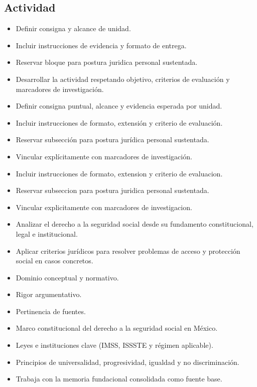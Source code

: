 \documentclass[12pt]{article}
\begin{document}
\subsection*{Actividad}
\begin{itemize}[leftmargin=*]
  \item Definir consigna y alcance de unidad.
  \item Incluir instrucciones de evidencia y formato de entrega.
  \item Reservar bloque para postura juridica personal sustentada.
  \item Desarrollar la actividad respetando objetivo, criterios de evaluación y marcadores de investigación.
  \item Definir consigna puntual, alcance y evidencia esperada por unidad.
  \item Incluir instrucciones de formato, extensión y criterio de evaluación.
  \item Reservar subsección para postura jurídica personal sustentada.
  \item Vincular explícitamente con marcadores de investigación.
  \item Incluir instrucciones de formato, extension y criterio de evaluacion.
  \item Reservar subseccion para postura juridica personal sustentada.
  \item Vincular explicitamente con marcadores de investigacion.
  \item Analizar el derecho a la seguridad social desde su fundamento constitucional, legal e institucional.
  \item Aplicar criterios jurídicos para resolver problemas de acceso y protección social en casos concretos.
  \item Dominio conceptual y normativo.
  \item Rigor argumentativo.
  \item Pertinencia de fuentes.
  \item Marco constitucional del derecho a la seguridad social en México.
  \item Leyes e instituciones clave (IMSS, ISSSTE y régimen aplicable).
  \item Principios de universalidad, progresividad, igualdad y no discriminación.
  \item Trabaja con la memoria fundacional consolidada como fuente base.
\end{itemize}
\end{document}
